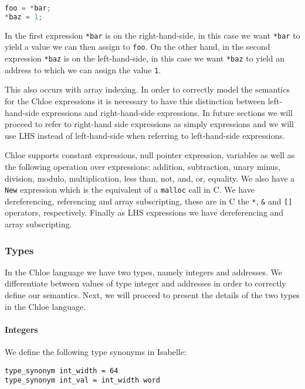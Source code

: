 \begin{lstlisting}[language=C, frame=single]
foo = *bar;
*baz = 1;
\end{lstlisting}

In the first expression \verb|*bar| is on the right-hand-side, in this case we want \verb|*bar| to yield a value we can then assign to \verb|foo|.
On the other hand, in the second expression \verb|*baz| is on the left-hand-side, in this case we want \verb|*baz| to yield an address to which we can assign the value \verb|1|.

This also occurs with array indexing.
In order to correctly model the semantics for the Chloe expressions it is necessary to have this distinction between left-hand-side expressions and right-hand-side expressions.
In future sections we will proceed to refer to right-hand side expressions as simply expressions and we will use LHS instead of left-hand-side when referring to left-hand-side expressions.

Chloe supports constant expressions, null pointer expression, variables as well as the following operation over expressions: addition, subtraction, unary minus, division, modulo, multiplication, less than, not, and, or, equality.
We also have a \verb|New| expression which is the equivalent of a \verb|malloc| call in C.
We have dereferencing, referencing and array subscripting, these are in C the \verb|*|, \verb|&| and \verb|[]| operators, respectively.
Finally as LHS expressions we have dereferencing and array subscripting.

\subsubsection{Types}

In the Chloe language we have two types, namely integers and addresses.
We differentiate between values of type integer and addresses in order to correctly define our semantics.
Next, we will proceed to present the details of the two types in the Chloe language.

\paragraph{Integers}

We define the following type synonyms in Isabelle:

\begin{lstlisting}[frame=single]
type_synonym int_width = 64
type_synonym int_val = int_width word
\end{lstlisting}


